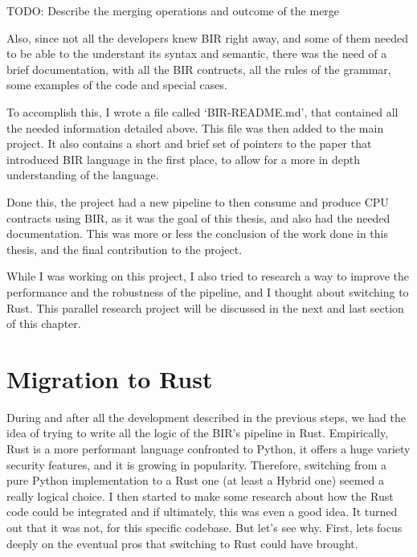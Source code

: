TODO: Describe the merging operations and outcome of the merge

Also, since not all the developers knew BIR right away, and some of them needed
to be able to the understant its syntax and semantic, there was the need of a brief
documentation, with all the BIR contructs, all the rules of the grammar, some
examples of the code and special cases.

To accomplish this, I wrote a file called `BIR-README.md', that contained all
the needed information detailed above. This file was then added to the main project.
It also contains a short and brief set of pointers to the paper that introduced
BIR language in the first place, to allow for a more in depth understanding of the
language.

Done this, the project had a new pipeline to then consume and produce CPU
contracts using BIR, as it was the goal of this thesis, and also had the needed
documentation. This was more or less the conclusion of the work done in this thesis,
and the final contribution to the project.

While I was working on this project, I also tried to research a way to improve the
performance and the robustness of the pipeline, and I thought about switching to
Rust. This parallel research project will be discussed in the next and last section
of this chapter.

\section{Migration to Rust}
\label{cha:Migration to Rust} During and after all the development described in the
previous steps, we had the idea of trying to write all the logic of the BIR's
pipeline in Rust. Empirically, Rust is a more performant language confronted to
Python, it offers a huge variety security features, and it is growing in
popularity. Therefore, switching from a pure Python implementation to a Rust one
(at least a Hybrid one) seemed a really logical choice. I then started to make some
research about how the Rust code could be integrated and if ultimately, this was
even a good idea. It turned out that it was not, for this specific codebase. But
let's see why. First, lets focus deeply on the eventual pros that switching to Rust
could have brought.

